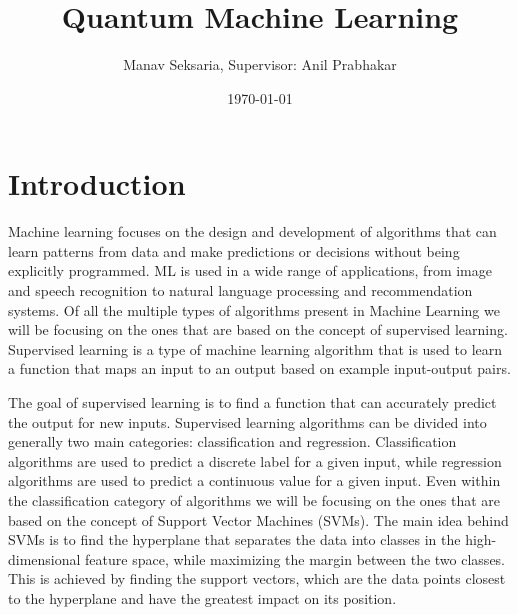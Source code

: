 \documentclass[hidelinks]{book}
\begin{document}
\title{Quantum Machine Learning}
\author{Manav Seksaria, Supervisor: Anil Prabhakar}
\course{}
\date{\today}

\section{Introduction}
Machine learning focuses on the design and development of algorithms that can learn patterns from data and make predictions or decisions without being explicitly programmed. ML is used in a wide range of applications, from image and speech recognition to natural language processing and recommendation systems. Of all the multiple types of algorithms present in Machine Learning we will be focusing on the ones that are based on the concept of supervised learning. Supervised learning is a type of machine learning algorithm that is used to learn a function that maps an input to an output based on example input-output pairs.

The goal of supervised learning is to find a function that can accurately predict the output for new inputs. Supervised learning algorithms can be divided into generally two main categories: classification and regression. Classification algorithms are used to predict a discrete label for a given input, while regression algorithms are used to predict a continuous value for a given input. Even within the classification category of algorithms we will be focusing on the ones that are based on the concept of Support Vector Machines (SVMs). The main idea behind SVMs is to find the hyperplane that separates the data into classes in the high-dimensional feature space, while maximizing the margin between the two classes. This is achieved by finding the support vectors, which are the data points closest to the hyperplane and have the greatest impact on its position.
\end{document}
